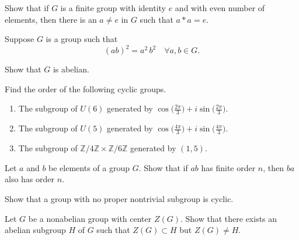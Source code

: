 \begin{mdframed}
    \vspace{0.752cm}
    \begin{Exercise}
        Show that if $G$ is a finite group with identity $e$ and with even number of elements, then there is an 
        $a \neq e$ in $G$ such that $a * a = e$.
    \end{Exercise}

    \vspace{0.752cm}
    \begin{Exercise}
        Suppose $G$ is a group such that 
        \[
            (ab)^2 = a^2\, b^2 \quad \forall a, b \in G.
        \]

        Show that $G$ is abelian.
    \end{Exercise}

    \vspace{0.752cm}
    \begin{Exercise}
        Find the order of the following cyclic groups.
        \begin{enumerate}
            \item The subgroup of $U(6)$ generated by $\displaystyle \cos \biggl( \frac{2\pi}{3}\biggr) + i \sin \biggl( \frac{2\pi}{3}\biggr)$.
            \item The subgroup of $U(5)$ generated by $\displaystyle \cos \biggl( \frac{4\pi}{3}\biggr) + i \sin \biggl( \frac{4\pi}{3}\biggr)$.
            \item The subgroup of $\mathbb{Z}/4\mathbb{Z} \times \mathbb{Z}/6\mathbb{Z}$ generated by $(1,5)$.
        \end{enumerate}
    \end{Exercise}

    \vspace{0.752cm}
    \begin{Exercise}
        Let $a$ and $b$ be elements of a group $G$. Show that if $ab$ has finite order $n$, then $ba$ also has order $n$.
    \end{Exercise}

    \vspace{0.752cm}
    \begin{Exercise}
        Show that a group with no proper nontrivial subgroup is cyclic. 
    \end{Exercise}

    \vspace{0.752cm}
    \begin{Exercise}
        Let $G$ be a nonabelian group with center $Z(G).$ Show that there exists an abelian subgroup $H$ of 
        $G$ such that $Z(G) \subset H$ but $Z(G) \neq H$. 
    \end{Exercise}


\end{mdframed}
